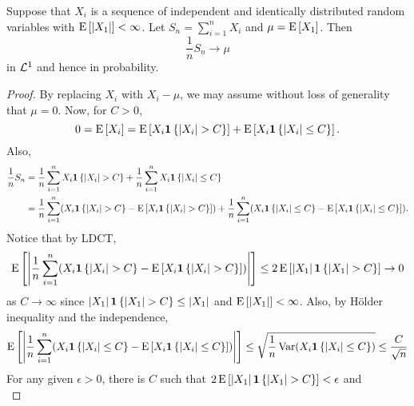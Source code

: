 \begin{theorem}
    Suppose that $X_i$ is a sequence of independent and identically distributed random variables 
    with $\operatorname{E}\left[ {\left\lvert {X_1} \right\rvert} \right]<\infty$. Let $S_n = \sum_{i=1}^n X_i$ and $\mu = \operatorname{E}\left[ {X_1} \right]$. 
    Then 
    \begin{equation*}
        \frac{1}{n}S_n\to\mu
    \end{equation*}
    in $\mathcal{L}^1$ and hence in probability. 
\end{theorem}
\begin{proof}
    By replacing $X_i$ with $X_i-\mu$, we may assume without loss of generality 
    that $\mu = 0$. Now, for $C>0$, 
    \begin{equation*}
        0 = \operatorname{E}\left[ {X_i} \right] = \operatorname{E}\left[ {X_i\mathbf{1}\left\{ {\left\lvert {X_i} \right\rvert>C} \right\}} \right] + \operatorname{E}\left[ {X_i\mathbf{1}\left\{ {\left\lvert {X_i} \right\rvert\leq C} \right\}} \right]. 
    \end{equation*}
    Also, 
    \begin{equation*}
        \begin{split}
            \frac{1}{n}S_n &= 
            \frac{1}{n}\sum_{i=1}^nX_i\one\set{\abs{X_i}>C}  
            + \frac{1}{n}\sum_{i=1}^nX_i\one\set{\abs{X_i}\leq C} \\ 
            &= \frac{1}{n}\sum_{i=1}^n\pth{X_i\one\set{\abs{X_i}>C} - \E\sbrc{X_i\one\set{\abs{X_i}>C}}} 
            + \frac{1}{n}\sum_{i=1}^n\pth{X_i\one\set{\abs{X_i}\leq C} - \E\sbrc{X_i\one\set{\abs{X_i}\leq C}}}. 
        \end{split}
    \end{equation*}
    Notice that by LDCT,
    \begin{equation*}
        \E\sbrc{\abs{\frac{1}{n}\sum_{i=1}^n\pth{X_i\one\set{\abs{X_i}>C} - \E\sbrc{X_i\one\set{\abs{X_i}>C}}}}} 
        \leq 2\E\sbrc{\abs{X_1}\one\set{\abs{X_1}>C}}\to 0
    \end{equation*}
    as $C\to\infty$ since $\left\lvert {X_1} \right\rvert\mathbf{1}\left\{ {\left\lvert {X_1} \right\rvert>C} \right\}\leq\left\lvert {X_1} \right\rvert$ and 
    $\operatorname{E}\left[ {\left\lvert {X_1} \right\rvert} \right]<\infty$. Also, by H\"older inequality and the independence,  
    \begin{equation*}
        \E\sbrc{\abs{\frac{1}{n}\sum_{i=1}^n\pth{X_i\one\set{\abs{X_i}\leq C} - \E\sbrc{X_i\one\set{\abs{X_i}\leq C}}}}} 
        \leq \sqrt{\frac{1}{n}\Var(X_i\one\set{\abs{X_i}\leq C})} \leq \frac{C}{\sqrt{n}} 
    \end{equation*}
    For any given $\epsilon>0$, there is $C$ such that $2\operatorname{E}\left[ {\left\lvert {X_1} \right\rvert\mathbf{1}\left\{ {\left\lvert {X_1} \right\rvert>C} \right\}} \right] < \epsilon$ and 
    \begin{equation*}

\end{equation*}
\end{proof}
